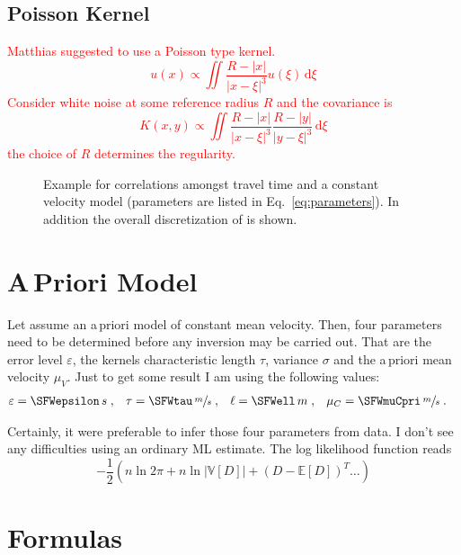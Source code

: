 \documentclass[11pt]{article}
\newcommand\worries[1]{\textcolor{red}{#1}}
\newcommand\Mean[1]{\mathbb{E}\!\left[#1\right]}
\newcommand\Var[1]{\mathbb{V}\!\left[#1\right]}
\begin{document}
\subsection{Poisson Kernel}
\worries{Matthias suggested to use a Poisson type kernel.
\begin{equation}
    u(x) \propto \iint \frac{R-|x|}{|x-\xi|^3} u(\xi) \, \mathrm d \xi
\end{equation}
Consider white noise at some reference radius $R$ and the covariance is
\begin{equation}
    K(x,y) \propto \iint \frac{R-|x|}{|x-\xi|^3} \frac{R-|y|}{|y-\xi|^3} \, \mathrm d \xi
\end{equation}
the choice of $R$ determines the regularity. }

\begin{figure}
    \centering
    
    \caption{Example for correlations amongst travel time and a constant velocity model (parameters are listed in Eq.~\ref{eq:parameters}).
        In addition the overall discretization of is shown. }
    \label{fig:correlation}
\end{figure}


\section{A\,Priori Model}

Let assume an a\,priori model of constant mean velocity.
Then, four parameters need to be determined before any inversion may be carried out.
That are the error level $\varepsilon$, the kernels characteristic length $\tau$, variance $\sigma$ and the a\,priori mean velocity $\mu_V$.
Just to get some result I am using the following values:
\begin{align}\label{eq:parameters}
    \varepsilon &= \SFWepsilon \, s \;,&
    \tau &= \SFWtau \, \sfrac ms \;,&
    \ell &= \SFWell \, m \;,&
    \mu_C &= \SFWmuCpri \, \sfrac ms \;.
\end{align}

Certainly, it were preferable to infer those four parameters from data.
I don't see any difficulties using an ordinary ML estimate.
The log likelihood function reads
\begin{equation}
    -\frac 12 \left( n \ln 2\pi + n \ln |\Var D| + (D - \Mean D)^T \dots  \right)
\end{equation}


\section{Formulas}
\end{document}
